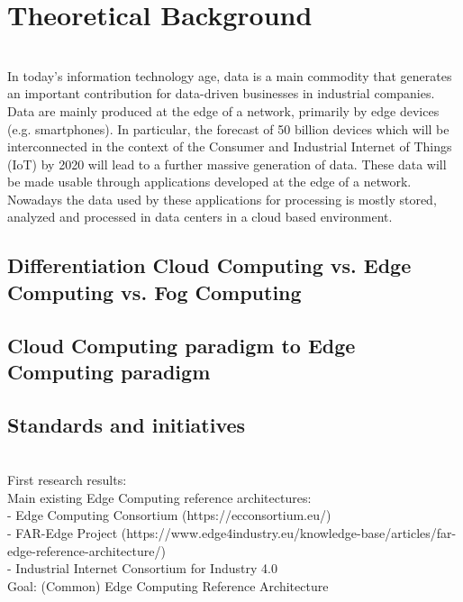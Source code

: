 \section{Theoretical Background}\label{sec:background}
 
\\

In today's information technology age, data is a main commodity that generates an important contribution for data-driven businesses in industrial companies. Data are mainly produced at the edge of a network, primarily by edge devices (e.g. smartphones). In particular, the forecast of 50 billion devices which will be interconnected in the context of the Consumer and Industrial Internet of Things (IoT) by 2020 will lead to a further massive generation of data. These data will be made usable through applications developed at the edge of a network. Nowadays the data used by these applications for processing is mostly stored, analyzed and processed in data centers in a cloud based environment.

\subsection{Differentiation Cloud Computing vs. Edge Computing vs. Fog Computing}

\subsection{Cloud Computing paradigm to Edge Computing paradigm}

\subsection{Standards and initiatives}
\\

First research results:\\
Main existing Edge Computing reference architectures:\\
- Edge Computing Consortium (https://ecconsortium.eu/)\\ 
- FAR-Edge Project (https://www.edge4industry.eu/knowledge-base/articles/far-edge-reference-architecture/)\\
- Industrial Internet Consortium for Industry 4.0\\

Goal: (Common) Edge Computing Reference Architecture